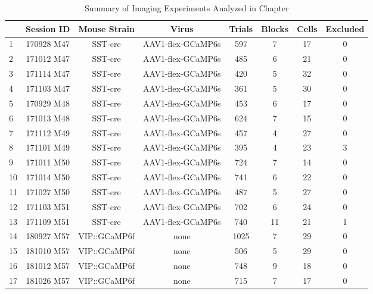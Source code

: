 \begin{table}[htbp]
    \centering
    
    \caption{Summary of Imaging Experiments Analyzed in Chapter \thechapter}
    
    \scriptsize
    \begin{tabular}{lccccccc}
          & Session ID & Mouse Strain & Virus &  \textnumero{} Trials & \textnumero{} Blocks & \textnumero{}  Cells & \textnumero{}  Excluded \\
          \midrule
    1     & 170928 M47 & SST-cre & AAV1-flex-GCaMP6s & 597   & 7     & 17    & 0 \\
    2     & 171012 M47 & SST-cre & AAV1-flex-GCaMP6s & 485   & 6     & 21    & 0 \\
    3     & 171114 M47 & SST-cre & AAV1-flex-GCaMP6s & 420   & 5     & 32    & 0 \\
    4     & 171103 M47 & SST-cre & AAV1-flex-GCaMP6s & 361   & 5     & 30    & 0 \\
    5     & 170929 M48 & SST-cre & AAV1-flex-GCaMP6s & 453   & 6     & 17    & 0 \\
    6     & 171013 M48 & SST-cre & AAV1-flex-GCaMP6s & 624   & 7     & 15    & 0 \\
    7     & 171112 M49 & SST-cre & AAV1-flex-GCaMP6s & 457   & 4     & 27    & 0 \\
    8     & 171101 M49 & SST-cre & AAV1-flex-GCaMP6s & 395   & 4     & 23    & 3 \\
    9     & 171011 M50 & SST-cre & AAV1-flex-GCaMP6s & 724   & 7     & 14    & 0 \\
    10    & 171014 M50 & SST-cre & AAV1-flex-GCaMP6s & 741   & 6     & 22    & 0 \\
    11    & 171027 M50 & SST-cre & AAV1-flex-GCaMP6s & 487   & 5     & 27    & 0 \\
    12    & 171103 M51 & SST-cre & AAV1-flex-GCaMP6s & 702   & 6     & 24    & 0 \\
    13    & 171109 M51 & SST-cre & AAV1-flex-GCaMP6s & 740   & 11    & 21    & 1 \\
    14    & 180927 M57 & VIP::GCaMP6f & none  & 1025  & 7     & 29    & 0 \\
    15    & 181010 M57 & VIP::GCaMP6f & none  & 506   & 5     & 29    & 0 \\
    16    & 181012 M57 & VIP::GCaMP6f & none  & 748   & 9     & 18    & 0 \\
    17    & 181026 M57 & VIP::GCaMP6f & none  & 715   & 7     & 17    & 0 \\

\end{tabular}
\end{table}

